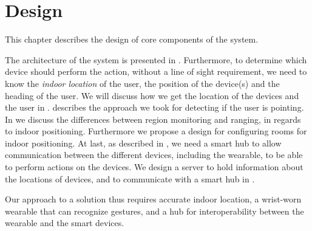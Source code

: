 \chapter{Design}\label{chap:design}

This chapter describes the design of core components of the system.

The architecture of the system is presented in .
Furthermore, to determine which device should perform the action, 
without a line of sight requirement, 
we need to know the \emph{indoor location} of the user, 
the position of the device(s) and the heading of the user. 
We will discuss how we get the location of the devices and the user in .
 describes the approach we took for detecting if the user is pointing.
In  we discuss the differences between region monitoring and ranging, 
in regards to indoor positioning. 
Furthermore we propose a design for configuring rooms for indoor positioning.
At last, as described in , 
we need a smart hub to allow communication between the different devices, 
including the wearable, to be able to perform actions on the devices. 
We design a server to hold information about the locations of devices,
and to communicate with a smart hub in . 

Our approach to a solution thus requires accurate indoor location, 
a wrist-worn wearable that can recognize gestures, 
and a hub for interoperability between the wearable and the smart devices. 








